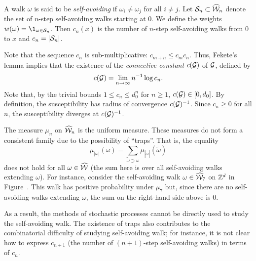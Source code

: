 \begin{example}
A walk $\omega$ is said to be \emph{self-avoiding} if $\omega_i \ne \omega_j$
for all $i \ne j$. Let $\mathcal{S}_n \subset \widehat{\mathcal{W}}_n$ denote the set of $n$-step
self-avoiding walks starting at $0$. We define the weights $w(\omega) = \1_{\omega\in\Scal_n}$.
Then $c_n(x)$ is the number of $n$-step self-avoiding walks from $0$ to $x$
and $c_n = |\mathcal{S}_n|$.

Note that the sequence $c_n$ is sub-multiplicative: $c_{m+n} \le c_m c_n$.
Thus, Fekete's lemma implies that the existence of the \emph{connective constant}
$c(\mathcal{G})$ of $\mathcal{G}$, defined by
\begin{equation}
c(\mathcal{G}) = \lim_{n\rightarrow\infty} n^{-1} \log c_n.
\end{equation}
Note that, by the trivial bounds $1 \le c_n \le d_0^n$ for $n \ge 1$, $c(\mathcal{G}) \in [0, d_0]$.
By definition, the susceptibility has radius of convergence $c(\mathcal{G})^{-1}$.
Since $c_n \ge 0$ for all $n$, the susceptibility diverges at $c(\mathcal{G})^{-1}$.

The measure $\mu_n$ on $\widehat{\mathcal{W}}_n$ is the uniform measure.
These measures do not form a consistent family due to the possibility of ``traps''. That is, the equality
\begin{equation}
\mu_{|\omega|}(\omega) = \sum_{\tilde\omega \supset \omega} \mu_{|\tilde\omega|}(\tilde\omega)
\end{equation}
does not hold for all $\omega\in\widehat{\mathcal{W}}$ (the sum here is over all self-avoiding walks extending $\omega$).
For instance, consider the self-avoiding walk $\omega\in\widehat{\mathcal{W}}_7$
on ${ {{\mathbb Z}}^d }$ in Figure~\REF. %
This walk has positive probability under $\mu_7$ but,
since there are no self-avoiding walks extending $\omega$, the sum on the 
right-hand side above is $0$.

As a result, the methods of stochastic processes cannot be directly used to
study the self-avoiding walk. The existence of traps also contributes to the
combinatorial difficulty of studying self-avoiding walk; for instance, it is
not clear how to express $c_{n+1}$ (the number of $(n+1)$-step self-avoiding walks)
in terms of $c_n$.

\end{example}

